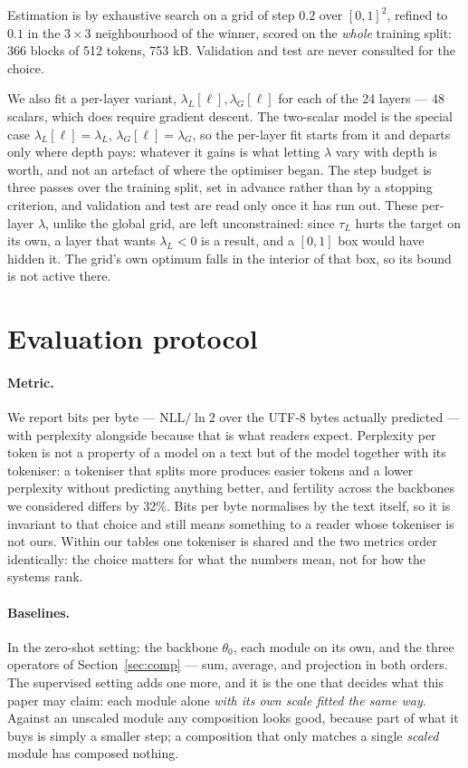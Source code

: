 \documentclass[10pt,twocolumn,a4paper]{article}
\begin{document}
Estimation is by exhaustive search on a grid of step $0.2$ over $[0,1]^2$,
refined to $0.1$ in the $3\times3$ neighbourhood of the winner, scored on the
\emph{whole} training split: 366 blocks of 512 tokens, 753 kB. Validation and test are never
consulted for the choice.

We also fit a per-layer variant, $\lambda_L[\ell],\lambda_G[\ell]$ for each of
the 24 layers --- 48 scalars, which does require gradient descent. The two-scalar
model is the special case $\lambda_L[\ell]=\lambda_L$, $\lambda_G[\ell]=\lambda_G$,
so the per-layer fit starts from it and departs only where depth pays: whatever
it gains is what letting $\lambda$ vary with depth is worth, and not an artefact
of where the optimiser began. The step budget is three passes over the training
split, set in advance rather than by a stopping criterion, and validation and
test are read only once it has run out. These per-layer $\lambda$, unlike the
global grid, are left unconstrained: since $\tau_L$ hurts the target on its own,
a layer that wants $\lambda_L<0$ is a result, and a $[0,1]$ box would have hidden
it. The grid's own optimum falls in the interior of that box, so its bound is
not active there.

\section{Evaluation protocol}
\label{sec:eval}

\paragraph{Metric.} We report bits per byte --- $\mathrm{NLL}/\ln 2$ over the
UTF-8 bytes actually predicted --- with perplexity alongside because that is what
readers expect. Perplexity per token is not a property of a model on a text but
of the model together with its tokeniser: a tokeniser that splits more produces
easier tokens and a lower perplexity without predicting anything better, and
fertility across the backbones we considered differs by 32\%. Bits per byte
normalises by the text itself, so it is invariant to that choice and still means
something to a reader whose tokeniser is not ours. Within our tables one
tokeniser is shared and the two metrics order identically: the choice matters
for what the numbers mean, not for how the systems rank.

\paragraph{Baselines.} In the zero-shot setting: the backbone $\theta_0$, each
module on its own, and the three operators of Section~\ref{sec:comp} --- sum,
average, and projection in both orders. The supervised setting adds one more,
and it is the one that decides what this paper may claim: each module alone
\emph{with its own scale fitted the same way}. Against an unscaled module any
composition looks good, because part of what it buys is simply a smaller step; a
composition that only matches a single \emph{scaled} module has composed
nothing.
\end{document}
